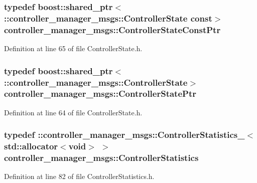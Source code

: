 \subsubsection[{\-Controller\-State\-Const\-Ptr}]{\setlength{\rightskip}{0pt plus 5cm}typedef boost\-::shared\-\_\-ptr$<$ \-::{\bf controller\-\_\-manager\-\_\-msgs\-::\-Controller\-State} const$>$ {\bf controller\-\_\-manager\-\_\-msgs\-::\-Controller\-State\-Const\-Ptr}}\label{namespacecontroller__manager__msgs_adb7b9513a0b282705d284f8e3aca3d1c}


\-Definition at line 65 of file \-Controller\-State.\-h.

\subsubsection[{\-Controller\-State\-Ptr}]{\setlength{\rightskip}{0pt plus 5cm}typedef boost\-::shared\-\_\-ptr$<$ \-::{\bf controller\-\_\-manager\-\_\-msgs\-::\-Controller\-State}$>$ {\bf controller\-\_\-manager\-\_\-msgs\-::\-Controller\-State\-Ptr}}\label{namespacecontroller__manager__msgs_ab586338f93bfc2f9c9da080e85e63503}


\-Definition at line 64 of file \-Controller\-State.\-h.

\subsubsection[{\-Controller\-Statistics}]{\setlength{\rightskip}{0pt plus 5cm}typedef \-::{\bf controller\-\_\-manager\-\_\-msgs\-::\-Controller\-Statistics\-\_\-}$<$std\-::allocator$<$void$>$ $>$ {\bf controller\-\_\-manager\-\_\-msgs\-::\-Controller\-Statistics}}\label{namespacecontroller__manager__msgs_a7b4a22af1c2a0dcac6d5120d31274807}


\-Definition at line 82 of file \-Controller\-Statistics.\-h.

